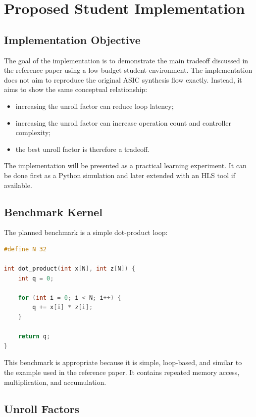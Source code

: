\documentclass[conference]{IEEEtran}
\begin{document}
\section{Proposed Student Implementation}

\subsection{Implementation Objective}

The goal of the implementation is to demonstrate the main tradeoff discussed in the reference paper using a low-budget student environment. The implementation does not aim to reproduce the original ASIC synthesis flow exactly. Instead, it aims to show the same conceptual relationship:

\begin{itemize}
    \item increasing the unroll factor can reduce loop latency;
    \item increasing the unroll factor can increase operation count and controller complexity;
    \item the best unroll factor is therefore a tradeoff.
\end{itemize}

The implementation will be presented as a practical learning experiment. It can be done first as a Python simulation and later extended with an HLS tool if available.

\subsection{Benchmark Kernel}

The planned benchmark is a simple dot-product loop:

\begin{lstlisting}[language=C]
#define N 32

int dot_product(int x[N], int z[N]) {
    int q = 0;

    for (int i = 0; i < N; i++) {
        q += x[i] * z[i];
    }

    return q;
}
\end{lstlisting}

This benchmark is appropriate because it is simple, loop-based, and similar to the example used in the reference paper. It contains repeated memory access, multiplication, and accumulation.

\subsection{Unroll Factors}
\end{document}
